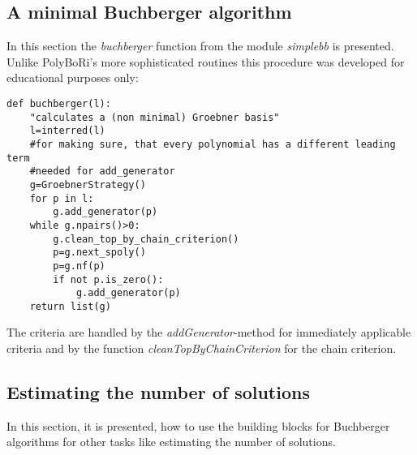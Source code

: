 \documentclass[]{article}
\newcommand{\PolyBoRi}{{\sc PolyBoRi}\xspace}
\newcommand{\functionname}[1]{\textit{#1}\xspace}
\newcounter{thm}
\begin{document}
\subsection{A minimal Buchberger algorithm}
In this section   the \functionname{buchberger} function from the module
\functionname{simplebb} is presented. Unlike \PolyBoRi's more sophisticated
routines this procedure was developed for educational purposes only:
\begin{lstlisting}
def buchberger(l):
    "calculates a (non minimal) Groebner basis"
    l=interred(l)
    #for making sure, that every polynomial has a different leading term
    #needed for add_generator
    g=GroebnerStrategy()
    for p in l:
        g.add_generator(p)
    while g.npairs()>0:
        g.clean_top_by_chain_criterion()
        p=g.next_spoly()
        p=g.nf(p)
        if not p.is_zero():
            g.add_generator(p)
    return list(g)
\end{lstlisting}
The criteria are handled by the \functionname{addGenerator}-method for
immediately applicable criteria and by the function \functionname{cleanTopByChainCriterion} for the chain criterion.


\subsection{Estimating the number of solutions}
In this section, it is presented, how to use the building blocks for Buchberger algorithms for other tasks like estimating the number of solutions.
\end{document}
